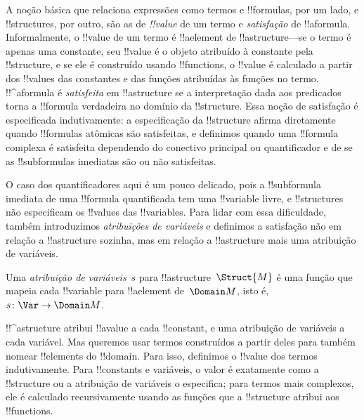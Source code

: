 \documentclass[../../../include/open-logic-section]{subfiles}
\begin{document}


\begin{explain}
A noção básica que relaciona expressões como termos e
!!{formula}s, por um lado, e !!{structure}s, por outro, são
as de \emph{!!{value}} de um termo e \emph{satisfação} de
!!a{formula}.  Informalmente, o !!{value} de um termo é !!a{element} de
!!a{structure}---se o termo é apenas uma constante, seu !!{value} é o
objeto atribuído à constante pela !!{structure}, e se ele é
construído usando !!{function}s, o !!{value} é calculado a partir dos
!!{value}s das constantes e das funções atribuídas às funções no
termo.  !!^a{formula} é \emph{satisfeita} em !!a{structure} se a
interpretação dada aos predicados torna a !!{formula} verdadeira no
domínio da !!{structure}. Essa noção de satisfação é
especificada indutivamente: a especificação da !!{structure} afirma
diretamente quando !!{formula}s atômicas são satisfeitas, e definimos quando uma
!!{formula} complexa é satisfeita dependendo do conectivo principal ou
quantificador e de se as !!{subformula}s imediatas são ou não
satisfeitas.

O caso dos quantificadores aqui é um pouco delicado, pois a
!!{subformula} imediata de uma !!{formula} quantificada tem uma
!!{variable} livre, e !!{structure}s não especificam os !!{value}s das
!!{variable}s.  Para lidar com essa dificuldade, também
introduzimos \emph{atribuições de variáveis} e definimos a satisfação não em
relação a !!a{structure} sozinha, mas em relação a !!a{structure}
mais uma atribuição de variáveis.
\end{explain}

\begin{defn}
Uma \emph{atribuição de variáveis}~$s$ para !!a{structure}~$\Struct{M}$ é uma
função que mapeia cada !!{variable} para !!a{element} de~$\Domain M$,
isto é, $s\colon \Var \to \Domain M$.
\end{defn}

\begin{explain}
!!^a{structure} atribui !!a{value} a cada !!{constant}, e uma
atribuição de variáveis a cada variável.  Mas queremos usar termos construídos
a partir deles para também nomear !!{element}s do !!{domain}.  Para isso,
definimos o !!{value} dos termos indutivamente. Para !!{constant}s e
variáveis, o valor é exatamente como a !!{structure} ou a atribuição de
variáveis o especifica; para termos mais complexos, ele é calculado
recursivamente usando as funções que a !!{structure} atribui aos
!!{function}s.
\end{explain}
\end{document}
